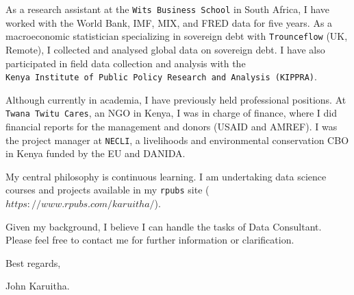 \documentclass[
  12pt,
]{article}
\begin{document}
As a research assistant at the \texttt{Wits\ Business\ School} in South
Africa, I have worked with the World Bank, IMF, MIX, and FRED data for
five years. As a macroeconomic statistician specializing in sovereign
debt with \texttt{Trounceflow} (UK, Remote), I collected and analysed
global data on sovereign debt. I have also participated in field data
collection and analysis with the
\texttt{Kenya\ Institute\ of\ Public\ Policy\ Research\ and\ Analysis\ (KIPPRA)}.

Although currently in academia, I have previously held professional
positions. At \texttt{Twana\ Twitu\ Cares}, an NGO in Kenya, I was in
charge of finance, where I did financial reports for the management and
donors (USAID and AMREF). I was the project manager at \texttt{NECLI}, a
livelihoods and environmental conservation CBO in Kenya funded by the EU
and DANIDA.

My central philosophy is continuous learning. I am undertaking data
science courses and projects available in my \texttt{rpubs} site
(\(https://www.rpubs.com/karuitha/\)).

Given my background, I believe I can handle the tasks of Data
Consultant. Please feel free to contact me for further information or
clarification.

Best regards,

John Karuitha.
\end{document}
